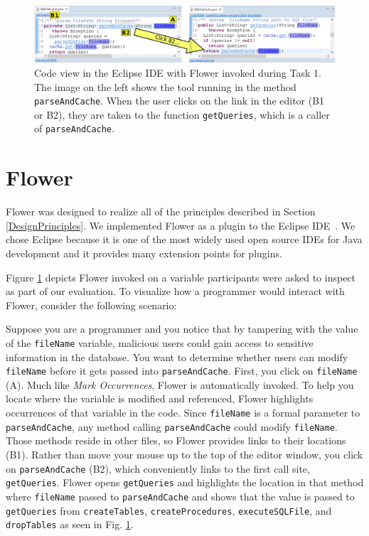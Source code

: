 \documentclass[conference]{IEEEtran}
\begin{document}
\begin{figure}
	\includegraphics[width=\textwidth]{images/toolScreenshot}
	\caption{Code view in the Eclipse IDE with Flower invoked during Task 1. The image on the left shows the tool running in the method \texttt{parseAndCache}. When the user clicks on the link in the editor (B1 or B2), they are taken to the function \texttt{getQueries}, which is a caller of \texttt{parseAndCache}.}	
	\label{fig:tool} 
\end{figure}

\section{Flower}
Flower was designed to realize all of the principles described in Section \ref{DesignPrinciples}. 
We implemented Flower as a plugin to the Eclipse IDE~\cite{Eclipse}. 
We chose Eclipse because it is one of the most widely used open source IDEs for Java development and it provides many extension points for plugins. 

Figure \ref{fig:tool} depicts Flower invoked on a variable participants were asked to inspect as part of our evaluation. To visualize how a programmer would interact with Flower, consider the following scenario:


Suppose you are a programmer and you notice that by tampering with the value of the \texttt{fileName} variable, malicious users could gain access to sensitive information in the database. 
You want to determine whether users can modify \texttt{fileName} before it gets passed into \texttt{parseAndCache}. 
First, you click on \texttt{fileName} (A).
Much like \emph{Mark Occurrences}, Flower is automatically invoked.
To help you locate where the variable is modified and referenced, Flower highlights occurrences of that variable in the code.
Since \texttt{fileName} is a formal parameter to \texttt{parseAndCache}, any method calling \texttt{parseAndCache} could modify \texttt{fileName}. 
Those methods reside in other files, so Flower  provides links to their locations (B1).
Rather than move your mouse up to the top of the editor window, you click on \texttt{parseAndCache} (B2), which conveniently links to the first call site, \texttt{getQueries}. 
Flower  opens \texttt{getQueries} and highlights the location in that method where \texttt{fileName} passed to \texttt{parseAndCache} and shows that the value is passed to \texttt{getQueries} from \texttt{createTables}, \texttt{createProcedures}, \texttt{executeSQLFile}, and \texttt{dropTables} as seen in Fig. \ref{fig:tool}.  
\end{document}
